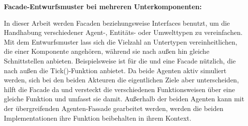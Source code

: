 \textbf{Facade-Entwurfsmuster bei mehreren Unterkomponenten:}

In dieser Arbeit werden Facaden beziehungsweise Interfaces benutzt, um die Handhabung verschiedener Agent-, Entitäts- oder Umwelttypen zu vereinfachen.
Mit dem Entwurfsmuster lass sich die Vielzahl an Untertypen vereinheitlichen, die einer Komponente angehören, während sie nach außen hin gleiche Schnittstellen anbieten.
Beispielsweise ist für die  und  eine Facade nützlich, die nach außen die Tick()-Funktion anbietet.
Da beide Agenten aktiv simuliert werden, sich bei den beiden Akteuren die eigentlichen Ziele aber unterscheiden, hilft die Facade da und versteckt die verschiedenen Funktionsweisen über eine gleiche Funktion und umfasst sie damit.
Außerhalb der beiden Agenten kann mit der übergreifenden Agenten-Fassade gearbeitet werden, werden die beiden Implementationen ihre Funktion beibehalten in ihrem Kontext.
